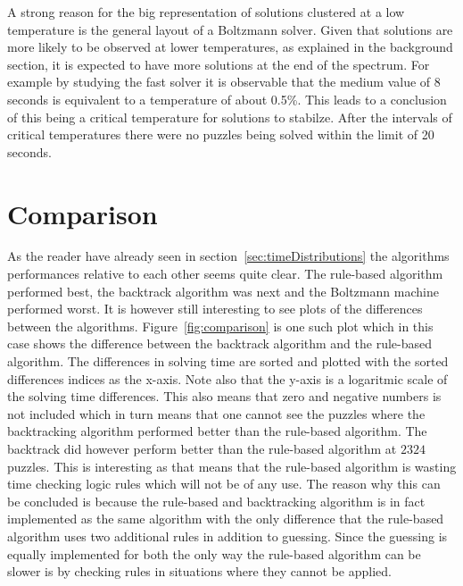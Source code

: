 \documentclass[a4paper,11pt]{kth-mag}
\begin{document}
A strong reason for the big representation of solutions clustered at a low temperature is the general layout of a Boltzmann solver.
Given that solutions are more likely to be observed at lower temperatures, as explained in the background section, it is expected to have more solutions at the end of the spectrum.
For example by studying the fast solver it is observable that the medium value of 8 seconds is equivalent to a temperature of about 0.5\%.
This leads to a conclusion of this being a critical temperature for solutions to stabilze.
After the intervals of critical temperatures there were no puzzles being solved within the limit of 20 seconds.

\FloatBarrier
\section{Comparison}
\label{sec:comparisonAnalysis}
As the reader have already seen in section~\ref{sec:timeDistributions} the algorithms performances relative to each other seems quite clear.
The rule-based algorithm performed best, the backtrack algorithm was next and the Boltzmann machine performed worst.
It is however still interesting to see plots of the differences between the algorithms.
Figure~\ref{fig:comparison} is one such plot which in this case shows the difference between the backtrack algorithm and the rule-based algorithm. The differences in solving time are sorted and plotted with the sorted differences indices as the x-axis. Note also that the y-axis is a logaritmic scale of the solving time differences.
This also means that zero and negative numbers is not included which in turn means that one cannot see the puzzles where the backtracking algorithm performed better than the rule-based algorithm.
The backtrack did however perform better than the rule-based algorithm at $2324$ puzzles.
This is interesting as that means that the rule-based algorithm is wasting time checking logic rules which will not be of any use.
The reason why this can be concluded is because the rule-based and backtracking algorithm is in fact implemented as the same algorithm with the only difference that the rule-based algorithm uses two additional rules in addition to guessing.
Since the guessing is equally implemented for both the only way the rule-based algorithm can be slower is by checking rules in situations where they cannot be applied.
\\
\end{document}
